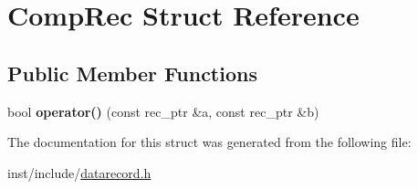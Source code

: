 \hypertarget{struct_comp_rec}{}\section{Comp\+Rec Struct Reference}
\label{struct_comp_rec}
\subsection*{Public Member Functions}
\begin{DoxyCompactItemize}
\item 
\mbox{\label{struct_comp_rec_a1c828ad19a4fa286890bd50c82f99a04}} 
bool {\bfseries operator()} (const rec\+\_\+ptr \&a, const rec\+\_\+ptr \&b)
\end{DoxyCompactItemize}


The documentation for this struct was generated from the following file\+:\begin{DoxyCompactItemize}
\item 
inst/include/\hyperlink{datarecord_8h}{datarecord.\+h}\end{DoxyCompactItemize}
